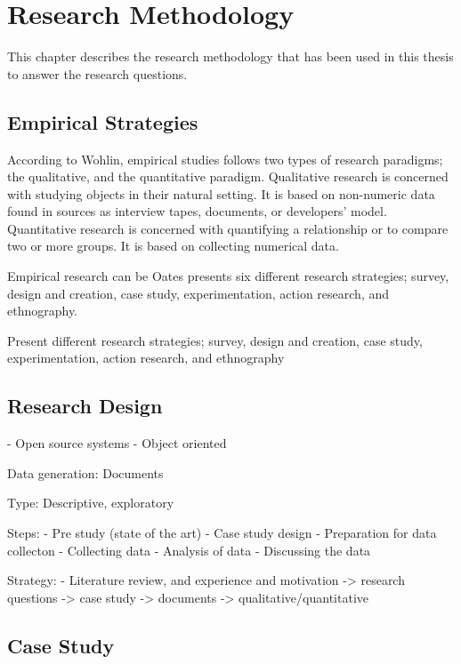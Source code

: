 
\chapter{Research Methodology}

This chapter describes the research methodology that has been used in this thesis to answer the research questions. 

\section{Empirical Strategies}
According to Wohlin\cite{Wohlin:2000:ESE:330775}, empirical studies follows two types of research paradigms; the qualitative, and the quantitative paradigm. Qualitative research is concerned with studying objects in their natural setting\cite{Wohlin:2000:ESE:330775}. It is based on non-numeric data found in sources as interview tapes, documents, or developers' model. Quantitative research is concerned with quantifying a relationship or to compare two or more groups\cite{Wohlin:2000:ESE:330775}. It is based on collecting numerical data. 

Empirical research can be Oates\cite{Oates:2006:RIS:1202299} presents six different research strategies; survey, design and creation, case study, experimentation, action research, and ethnography. 



Present different research strategies; survey, design and creation, case study, experimentation, action research, and ethnography



\section{Research Design}

- Open source systems
- Object oriented

Data generation: Documents

Type: Descriptive, exploratory

Steps:
- Pre study (state of the art)
- Case study design
- Preparation for data collecton
- Collecting data
- Analysis of data
- Discussing the data


Strategy:
- Literature review, and experience and motivation -> research questions -> case study -> documents -> qualitative/quantitative



\section{Case Study}


